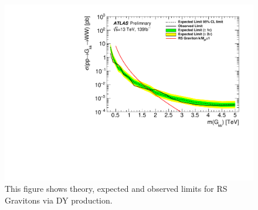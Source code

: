 \begin{figure}[h!]
  \centering
  \includegraphics[width=\hsize]{figures/results/limits/limits_rsg.pdf}

 \caption{This figure shows theory, expected and observed limits for RS Gravitons via DY production.}
  \label{fig:rsg_limit}
\end{figure} 
\FloatBarrier
